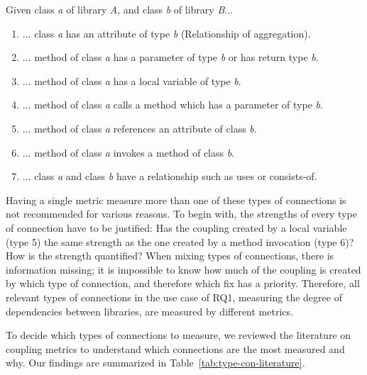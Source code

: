\blankls
Given class \textit{a} of library \textit{A}, and class \textit{b} of library \textit{B}...

\begin{enumerate}
  \item ... class \textit{a} has an attribute of type \textit{b} (Relationship of aggregation).
  \item ... method of class \textit{a} has a parameter of type \textit{b} or has return type \textit{b}.
  \item ... method of class \textit{a} has a local variable of type \textit{b}.
  \item ... method of class \textit{a} calls a method which has a parameter of type \textit{b}.
  \item ... method of class \textit{a} references an attribute of class \textit{b}.
  \item ... method of class \textit{a} invokes a method of class \textit{b}.
  \item ... class \textit{a} and class \textit{b} have a relationship such as uses or consists-of.
\end{enumerate}

Having a single metric measure more than one of these types of connections is not recommended for various reasons. To begin with, the strengths of every type of connection have to be justified: Has the coupling created by a local variable (type 5) the same strength as the one created by a method invocation (type 6)? How is the strength quantified? When mixing types of connections, there is information missing; it is impossible to know how much of the coupling is created by which type of connection, and therefore which fix has a priority. Therefore, all relevant types of connections in the use case of RQ1, measuring the degree of dependencies between libraries, are measured by different metrics.

To decide which types of connections to measure, we reviewed the literature on coupling metrics to understand which connections are the most measured and why. Our findings are summarized in Table~\ref{tab:type-con-literature}.

